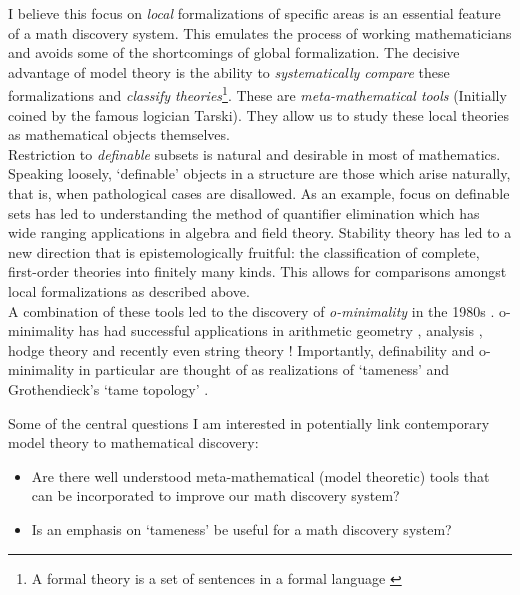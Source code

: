 I believe this focus on \textit{local} formalizations of specific areas is an essential feature of a math discovery system. This emulates the process of working mathematicians and avoids some of the shortcomings of global formalization. The decisive advantage of model theory is the ability to \textit{systematically compare} these formalizations and \textit{classify theories}\footnote[3]{A formal theory is a set of sentences in a formal language \cite{changModelTheory1990}}.
These are \textit{meta-mathematical tools} (Initially coined by the famous logician Tarski). They allow us to study these local theories as mathematical objects themselves. \\
Restriction to \textit{definable} subsets is natural and desirable in most of mathematics. Speaking loosely, `definable' objects in a structure are those which arise naturally, that is, when pathological cases are disallowed. As an example, focus on definable sets has led to understanding the method of quantifier elimination \cite{robinsonApplicationSymbolicLogic1952,TarskiDecisionMethod} which has wide ranging applications in algebra and field theory.
Stability theory has led to a  new direction that is epistemologically fruitful: the classification of complete, first-order theories into finitely many kinds. This allows for comparisons amongst local formalizations as described above.\\
A combination of these tools led to the discovery of \textit{o-minimality} in the 1980s \cite{pillayDefinableSetsOrdered1986, DENDRIES198497}. o-minimality has had successful applications in arithmetic geometry \cite{binyaminiWilkiesConjecturePfaffian2022,binyaminiBoundsRationalPoints2023}, analysis \cite{pilaOminimalityAndreOortConjecture2011}, hodge theory and recently even string theory \cite{douglasTamenessQuantumField2022,grimmComplexityTameQuantum2023,grimmFinitenessTheoremsCounting2023,grimmTamenessStringsDistance2022}!
Importantly, definability and o-minimality in particular are thought of as realizations of `tameness' and Grothendieck's `tame topology' \cite{acampoGrothendieckTameTopology2016, piekoszTameTopology2023}.
\par
Some of the central questions I am interested in potentially link contemporary model theory to mathematical discovery:
\begin{itemize}
    \item Are there well understood meta-mathematical (model theoretic) tools that can be incorporated to improve our math discovery system?
    \item Is an emphasis on `tameness' be useful for a math discovery system?
\end{itemize}


